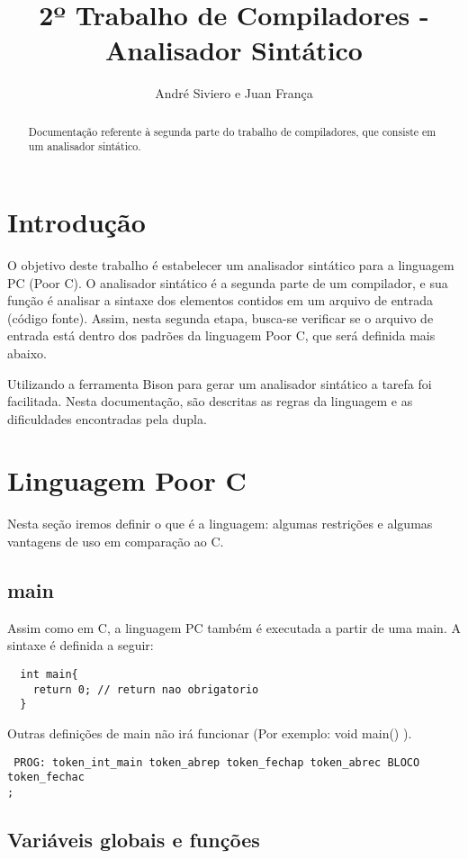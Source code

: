 \documentclass[a4paper,10pt]{article}
\title{2º Trabalho de Compiladores - Analisador Sintático}
\author{André Siviero e Juan França}
\begin{document}
\maketitle

\begin{abstract}
Documentação referente à segunda parte do trabalho de compiladores, que consiste em um analisador sintático.
\end{abstract}

\section{Introdução}
O objetivo deste trabalho é estabelecer um analisador sintático para a linguagem PC (Poor C). O analisador sintático é a segunda parte de um compilador,
e sua função é analisar a sintaxe dos elementos contidos em um arquivo de entrada (código fonte). Assim, nesta segunda etapa, busca-se verificar se o arquivo de entrada
está dentro dos padrões da linguagem Poor C, que será definida mais abaixo.

Utilizando a ferramenta Bison para gerar um analisador sintático a tarefa foi facilitada. Nesta documentação, são descritas as regras da linguagem e as dificuldades encontradas pela dupla.
\section{Linguagem Poor C}

Nesta seção iremos definir o que é a linguagem: algumas restrições e algumas vantagens de uso em comparação ao C.

\subsection{main}

Assim como em C, a linguagem PC também é executada a partir de uma main. A sintaxe é definida a seguir:

\begin{verbatim}
  int main{
    return 0; // return nao obrigatorio
  }
\end{verbatim}

Outras definições de main não irá funcionar (Por exemplo: void main() ).

\begin{verbatim}
 PROG: token_int_main token_abrep token_fechap token_abrec BLOCO token_fechac
;
\end{verbatim}

\subsection{Variáveis globais e funções}
\end{document}

